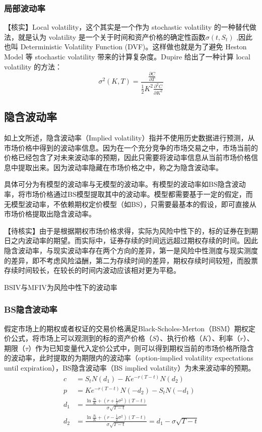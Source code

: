 \documentclass[11pt]{article}
\begin{document}
\subsubsection{局部波动率}

【核实】Local volatility，这个其实是一个作为 stochastic volatility 的一种替代做法，就是认为 volatility 是一个关于时间和资产价格的确定性函数$\sigma(t,S_t)$ ,因此也叫 Deterministic Volatility Function (DVF)。这样做也就是为了避免 Heston Model 等 stochastic volatility 带来的计算复杂度。Dupire 给出了一种计算 local volatility 的方法：
\begin{equation*}
    \sigma^2(K,T) = \frac{\frac{\partial C}{\partial T}}{\frac{1}{2} K^2 \frac{\partial^2 C}{\partial K^2}}
\end{equation*}

\subsection{隐含波动率}

如上文所述，隐含波动率（Implied volatility）指并不使用历史数据进行预测，从市场价格中得到的波动率信息。因为在一个充分竞争的市场交易之中，市场当前的价格已经包含了对未来波动率的预期，因此只需要将波动率信息从当前市场价格信息中提取出来。因为波动率隐藏在市场价格之中，称之为隐含波动率。

具体可分为有模型的波动率与无模型的波动率。有模型的波动率如BS隐含波动率，将市场价格通过BS模型提取其中的波动率。模型都需要基于一定的假定，而无模型波动率，不依赖期权定价模型（如BS），只需要最基本的假设，即可直接从市场价格提取出隐含波动率。

【待核实】由于是根据期权市场价格求得，实际为风险中性下的，标的证券在到期日之内波动率的期望。而实际中，证券存续的时间远远超过期权存续的时间。因此隐含波动率，与现实波动率存在两个方向的差异，第一是风险中性测度与现实测度的差异，即不考虑风险溢酬，第二为存续时间的差异，期权存续时间较短，而股票存续时间较长，在较长的时间内波动应该相对更为平稳。

BSIV与MFIV为风险中性下的波动率

\subsubsection{BS隐含波动率}

假定市场上的期权或者权证的交易价格满足Black-Scholes-Merton（BSM）期权定价公式，将市场上可以观测到的标的资产价格（$S$）、执行价格（$K$）、利率（$r$）、期限（$\tau$）作为已知变量代入定价公式中，则可以得到期权当前的市场价格所隐含的波动率，此时提取的为期限内的波动率（option-implied volatility expectations until expiration），BS隐含波动率（BS implied volatility）为未来波动率的预期。
\begin{align*}
    c &= S_t N(d_1) - Ke^{-r(T-t)} N(d_2) \\
    p & = K e^{-r(T-t)}N(-d_2) - S_t N(-d_1) \\
    d_1 &= \frac{\ln \frac{S_t}{K} + (r+\frac{1}{2}\sigma^2)(T-t)}{\sigma\sqrt{T-t}} \\
    d_2 &= \frac{\ln \frac{S_t}{K} + (r-\frac{1}{2}\sigma^2)(T-t)}{\sigma\sqrt{T-t}} = d_1 - \sigma\sqrt{T-t}
\end{align*}
\end{document}
